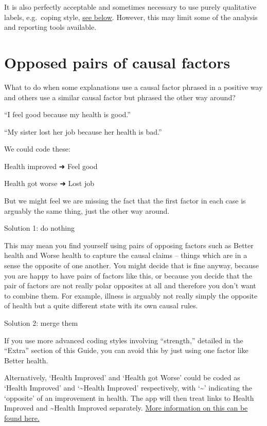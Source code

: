 \documentclass[
]{book}
\begin{document}
It is also perfectly acceptable and sometimes necessary to use purely qualitative labels, e.g.~coping style, \href{https://guide.causalmap.app/creating.html\#examples-of-non-quantitative-factors}{see below}. However, this may limit some of the analysis and reporting tools available.

\hypertarget{opposed-pairs-of-causal-factors}{%
\section{Opposed pairs of causal factors}\label{opposed-pairs-of-causal-factors}}

What to do when some explanations use a causal factor phrased in a positive way and others use a similar causal factor but phrased the other way around?

``I feel good because my health is good.''

``My sister lost her job because her health is bad.''

We could code these:

Health improved ➜ Feel good

Health got worse ➜ Lost job

But we might feel we are missing the fact that the first factor in each case is arguably the same thing, just the other way around.

Solution 1: do nothing

This may mean you find yourself using pairs of opposing factors such as Better health and Worse health to capture the causal claims -- things which are in a sense the opposite of one another. You might decide that is fine anyway, because you are happy to have pairs of factors like this, or because you decide that the pair of factors are not really polar opposites at all and therefore you don't want to combine them. For example, illness is arguably not really simply the opposite of health but a quite different state with its own causal rules.

Solution 2: merge them

If you use more advanced coding styles involving ``strength,'' detailed in the ``Extra'' section of this Guide, you can avoid this by just using one factor like Better health.

Alternatively, `Health Improved' and `Health got Worse' could be coded as `Health Improved' and `\textasciitilde Health Improved' respectively, with `\textasciitilde{}' indicating the `opposite' of an improvement in health. The app will then treat links to Health Improved and \textasciitilde Health Improved separately. \href{https://guide.causalmap.app/coding-opposites.html\#combining-opposites}{More information on this can be found here.}
\end{document}

